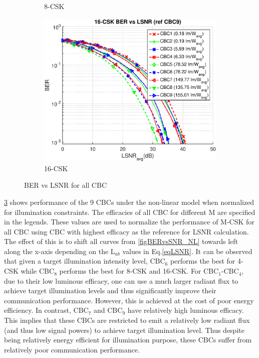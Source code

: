 \documentclass[10pt,letterpaper]{article}
\begin{document}
\begin{figure}[t]
\begin{subfigure}{0.32\textwidth}
			\caption{8-CSK}
			\label{fig8LSNR}
		\end{subfigure}
		\begin{subfigure}{0.32\textwidth}
		\centering
			\includegraphics[trim={0.0in 0.0in 0.1in 0.38in}, clip=true, width=\textwidth]{M16_16-CSK_BERvsLSNR_NL.eps}
			\caption{16-CSK}
			\label{fig16LSNR}
		\end{subfigure}
	\caption{BER vs LSNR for all CBC}
	\label{figBERvsLSNR}
\end{figure}

\figurename\ref{figBERvsLSNR} shows performance of the 9 CBCs under the non-linear model when normalized for illumination constraints. The efficacies of all CBC for different M are specified in the legends. These values are used to normalize the performance of M-CSK for all CBC using CBC with highest efficacy as the reference for LSNR calculation. The effect of this is to shift all curves from \figurename\ref{figBERvsSNR_NL} towards left along the x-axis depending on the L$_{ab}$ values in Eq.\eqref{eqLSNR}. It can be observed that given a target illumination intensity level, CBC$_{6}$ performs the best for 4-CSK while CBC$_{8}$ performs the best for 8-CSK and 16-CSK. For CBC$_{1}$-CBC$_{4}$, due to their low luminous efficacy, one can use a much larger radiant flux to achieve target illumination levels and thus significantly improve their communication performance. However, this is achieved at the cost of poor energy efficiency. In contrast, CBC$_{7}$ and CBC$_{9}$ have relatively high luminous efficacy. This implies that these CBCs are restricted to emit a relatively low radiant flux (and thus low signal powers) to achieve target illumination level. Thus despite being relatively energy efficient for illumination purpose, these CBCs suffer from relatively poor communication performance.
\end{document}
